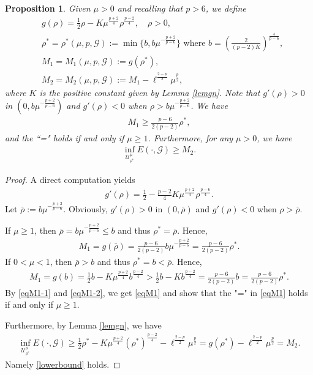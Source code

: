 \documentclass[10pt,a4paper]{article}
\newtheorem{proposition}[theorem]{Proposition}
\theoremstyle{definition} \theoremstyle{remark}
\numberwithin{equation}{section}
\newcommand{\G}{\mathcal{G}}
\newcommand{\U}{\mathcal{U}}
\begin{document}
\begin{proposition} \label{propinf}
	Given $\mu >0$ and recalling that $p>6$, we define
	\begin{align*}
		& g(\rho) = \frac12\rho - K\mu^{\frac{p+2}4} \rho^{\frac{p-2}4}, \quad \rho > 0,  \\
		& \rho^* = \rho^*(\mu,p,\G) := \min\{b,b\mu^{-\frac{p+2}{p-6}}\} \text{ where } b = \left( \frac2{(p-2)K}\right)^{\frac4{p-6}}, \\ 
		& M_1 = M_1(\mu,p,\G) := g(\rho^*), \\
		& M_2 = M_2(\mu,p,\G) := M_1 - \ell^{\frac{2-p}2}\mu^{\frac p2},
	\end{align*}
where $K$ is the positive constant given by Lemma \ref{lemgn}. Note that $g'(\rho) > 0$ in $(0,b\mu^{-\frac{p+2}{p-6}})$ and $g'(\rho) < 0$ when $\rho > b\mu^{-\frac{p+2}{p-6}}$. We have 
\begin{align} \label{eqM1}
	M_1 \geq \frac{p-6}{2(p-2)}\rho^*,
\end{align}
and the ``=" holds if and only if $\mu \geq 1$. Furthermore, for any $\mu > 0$, we have
\begin{align}
	\inf_{\U^\mu_{\rho^*}} E(\cdot,\G) \geq M_2. \label{lowerbound}
\end{align}
\end{proposition}

\begin{proof}
	A direct computation yields
	\begin{align*}
		g'(\rho) = \frac12 - \frac{p-2}4K\mu^{\frac{p+2}4} \rho^{\frac{p-6}4}.
	\end{align*}
    Let $\bar{\rho} := b\mu^{-\frac{p+2}{p-6}}$. Obviously, $g'(\rho) > 0$ in $(0,\bar{\rho})$ and $g'(\rho) < 0$ when $\rho > \bar{\rho}$.
    
	If $\mu \geq 1$, then $\bar{\rho} = b\mu^{-\frac{p+2}{p-6}} \leq b$ and thus $\rho^* = \bar{\rho}$. Hence,
	\begin{align} \label{eqM1-1}
		 M_1 = g(\bar{\rho}) = \frac{p-6}{2(p-2)}b\mu^{-\frac{p+2}{p-6}} =  \frac{p-6}{2(p-2)}\rho^*.
	\end{align}
    If $0 < \mu < 1$, then $\bar{\rho} > b$ and thus $\rho^* = b < \bar{\rho}$. Hence,
    \begin{align}\label{eqM1-2}
    	M_1 = g(b) = \frac12b - K\mu^{\frac{p+2}4}b^{\frac{p-2}4} > \frac12b - Kb^{\frac{p-2}4} = \frac{p-6}{2(p-2)}b = \frac{p-6}{2(p-2)}\rho^*.
    \end{align}
    By \eqref{eqM1-1} and \eqref{eqM1-2}, we get \eqref{eqM1} and show that the "=" in \eqref{eqM1} holds if and only if $\mu \geq 1$.
    
	Furthermore, by Lemma \ref{lemgn}, we have
	\begin{align*}
		\inf_{\U^\mu_{\rho^*}} E(\cdot,\G) \geq \frac12\rho^* - K\mu^{\frac{p+2}4}\left( \rho^*\right)^{\frac{p-2}4} - \ell^{\frac{2-p}2}\mu^\frac p2 = g(\rho^*) - \ell^{\frac{2-p}2}\mu^\frac p2 = M_2.
	\end{align*}
	Namely \eqref{lowerbound} holds.
\end{proof}
\end{document}

